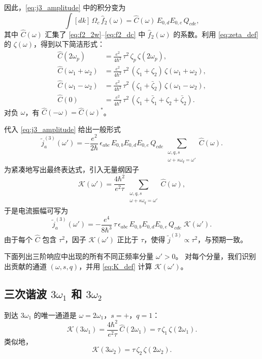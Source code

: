 因此，\eqref{eq:j3_amplitude} 中的积分变为
\begin{equation}
\int [dk]\, \Omega_c\,\hat f_2(\omega) = \hat C(\omega)\, E_{0,d}E_{0,e}\, Q_{cde},
\end{equation}
其中 \(\hat C(\omega)\) 汇集了 \eqref{eq:f2_2w}--\eqref{eq:f2_dc} 中 \(\hat f_2(\omega)\) 的系数。利用 \eqref{eq:zeta_def} 的 \(\zeta(\omega)\)，得到以下简洁形式：
\begin{align}
\hat C(2\omega_p) &= \frac{e^2}{4\hbar^2}\,\tau^2\,\zeta_p\,\zeta(2\omega_p), \label{eq:C_2w}\\
\hat C(\omega_1+\omega_2) &= \frac{e^2}{4\hbar^2}\,\tau^2\,(\zeta_1+\zeta_2)\,\zeta(\omega_1+\omega_2), \label{eq:C_sum}\\
\hat C(\omega_1-\omega_2) &= \frac{e^2}{4\hbar^2}\,\tau^2\,(\zeta_1+\bar\zeta_2)\,\zeta(\omega_1-\omega_2), \label{eq:C_diff}\\
\hat C(0) &= \frac{e^2}{4\hbar^2}\,\tau^2\,(\zeta_1+\bar\zeta_1+\zeta_2+\bar\zeta_2). \label{eq:C_0}
\end{align}
对负 \(\omega\)，有 \(\hat C(-\omega) = \hat C(\omega)^*\)。

代入 \eqref{eq:j3_amplitude} 给出一般形式
\begin{equation}
\tilde j^{(3)}_a(\omega') = -\frac{e^2}{2\hbar}\,\epsilon_{abc}\,E_{0,b}E_{0,d}E_{0,e}\,Q_{cde}\,
\sum_{\substack{\omega,q,s\\ \omega+s\omega_q=\omega'}} \hat C(\omega).
\label{eq:j3_form}
\end{equation}
为紧凑地写出最终表达式，引入无量纲因子
\begin{equation}
{ \mathcal{K}(\omega') = \frac{4\hbar^2}{e^2\tau}\,
\sum_{\substack{\omega,q,s\\ \omega+s\omega_q=\omega'}} \hat C(\omega) },
\label{eq:K_def}
\end{equation}
于是电流振幅可写为
\begin{equation}
\tilde j^{(3)}_a(\omega') = -\frac{e^4}{8\hbar^3}\,\tau\,
\epsilon_{abc}\,E_{0,b}E_{0,d}E_{0,e}\,Q_{cde}\; \mathcal{K}(\omega').
\label{eq:j3_final}
\end{equation}
由于每个 \(\hat C\) 包含 \(\tau^2\)，因子 \(\mathcal{K}(\omega')\) 正比于 \(\tau\)，使得 \(\tilde j^{(3)} \propto \tau^2\)，与预期一致。

下面列出三阶响应中出现的所有不同正频率分量 \(\omega'>0\)。
对每个分量，我们识别出贡献的通道 \((\omega,s,q)\)，并用 \eqref{eq:K_def} 计算 \(\mathcal{K}(\omega')\)。

\subsection{三次谐波 \(3\omega_1\) 和 \(3\omega_2\)}
到达 \(3\omega_1\) 的唯一通道是 \(\omega = 2\omega_1\)，\(s=+\)，\(q=1\)：
\begin{equation}
\mathcal{K}(3\omega_1) = \frac{4\hbar^2}{e^2\tau}\,\hat C(2\omega_1)
= \tau\,\zeta_1\,\zeta(2\omega_1).
\label{eq:K_3w1}
\end{equation}
类似地，
\begin{equation}
\mathcal{K}(3\omega_2) = \tau\,\zeta_2\,\zeta(2\omega_2).
\label{eq:K_3w2}
\end{equation}

